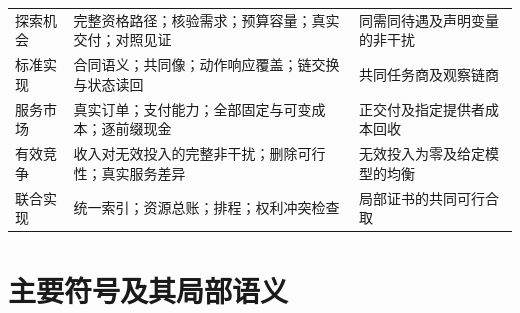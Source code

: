 \documentclass[UTF8,12pt,a4paper,openany,fontset=none,zihao=false]{ctexrep}
\theoremstyle{definition}
\newcommand{\1}{\mathbf 1}
\begin{document}
\begin{longtable}{p{}p{}p{}}
探索机会 & 完整资格路径；核验需求；预算容量；真实交付；对照见证 & 同需同待遇及声明变量的非干扰\\
标准实现 & 合同语义；共同像；动作响应覆盖；链交换与状态读回 & 共同任务商及观察链商\\
服务市场 & 真实订单；支付能力；全部固定与可变成本；逐前缀现金 & 正交付及指定提供者成本回收\\
有效竞争 & 收入对无效投入的完整非干扰；删除可行性；真实服务差异 & 无效投入为零及给定模型的均衡\\
联合实现 & 统一索引；资源总账；排程；权利冲突检查 & 局部证书的共同可行合取\\
\bottomrule
\end{longtable}
\endgroup

\section{主要符号及其局部语义}
\end{document}
